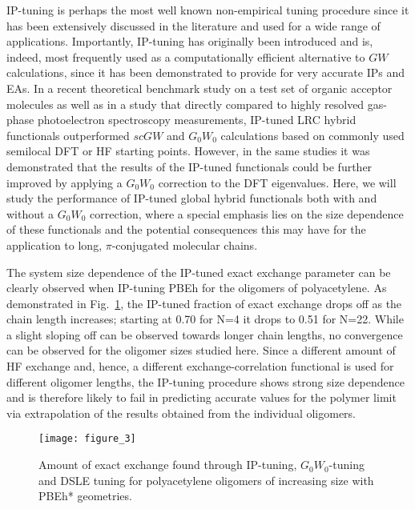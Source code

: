 \documentclass[journal=jctcce,manuscript=article,layout=twocolumn]{achemso}
\begin{document}
IP-tuning is perhaps the most well known non-empirical tuning procedure since it has been extensively discussed in the literature and used for a wide range of applications.\cite{jpc_a_2011_ip_tuning_metal_complex,jctc_2011_tuning_pi_olig, phys_rev_let_2011_fund_gap_tuning, jctc_2012_optical_rot_tuning, phys_rev_b_2012_tuning_qp_spec, acc_chem_res_2014_tuning_polyene,AccChemRes_Autschbach14, ann_rev_phys_chem_2010_tuning_RSH, phys_rev_b_2011_range_sep_size_dependent, JCP134.151101.2011, jcp_2011_triplet_instabilities, jcp_2014_torsion_potentials, JCTC5.1934.2014, JPCC8.3925.2014,PhysRevB.88.081204,PhysRevLett.106.226403}
Importantly, IP-tuning has originally been introduced and is, indeed, most frequently used as a computationally efficient alternative to $GW$ calculations, since it has been demonstrated to provide for very accurate IPs and EAs. In a recent theoretical benchmark study on a test set of organic acceptor molecules\cite{jctc_2016_accurate_IP_I_ccsdt_reference, jctc_2016_IP_II_lrc_funct_GW, jctc_2016_IP_III_GW_stuff} as well as in a study that directly compared to highly resolved gas-phase photoelectron spectroscopy measurements,\cite{gallandi_koerzd_lrc_g0w0_2015} IP-tuned LRC hybrid functionals outperformed $scGW$ and $G_0W_0$ calculations based on commonly used semilocal DFT or HF starting points. 
However, in the same studies it was demonstrated that the results of the IP-tuned functionals could be further improved by applying a $G_0W_0$ correction to the DFT eigenvalues. 
Here, we will study the performance of IP-tuned global hybrid functionals both with and without a $G_0W_0$ correction, where a special emphasis lies on the size dependence of these functionals and the potential consequences this may have for the application to long, $\pi$-conjugated molecular chains.

The system size dependence of the IP-tuned exact exchange parameter can be clearly observed when IP-tuning PBEh for the oligomers of polyacetylene. As demonstrated in Fig.~\ref{tuning}, the IP-tuned fraction 
of exact exchange drops off as the chain length increases; starting at 0.70 for N=4 it drops to 0.51 for N=22. While a slight sloping off can be observed towards longer chain lengths, no convergence can be observed for the oligomer sizes studied here. Since a different amount of HF exchange and, hence, a different exchange-correlation functional is used for different oligomer lengths, 
the IP-tuning procedure shows strong size dependence and is therefore likely to fail in predicting accurate values for the polymer limit via extrapolation of the results obtained from the individual oligomers. 
\begin{figure}[tb]
\texttt{[image: figure\_3]}
\caption{Amount of exact exchange found through IP-tuning, $G_0W_0$-tuning and DSLE tuning for polyacetylene oligomers of increasing size with PBEh* geometries.\label{tuning}}
\end{figure}
\end{document}
